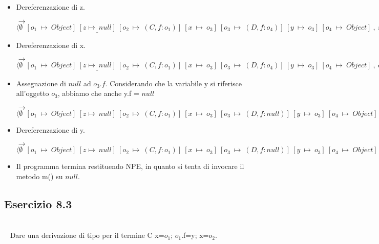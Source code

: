 \begin{itemize}
\vspace{0,5cm}
\item Dereferenzazione di z.

$\rightarrow$ $\langle\emptyset\:\:[o_1\:\mapsto\:Object]\:\underline{[z\mapsto\:null]}\:[o_2\:\mapsto\:(C,f:o_1)]\:[x\:\mapsto\:o_3]\:[o_3\:\mapsto\:(D,f:o_4)]\:[y\:\mapsto\:o_3]\:[o_4\:\mapsto\:Object]\:,\:x.f=null;.....\rangle$

\vspace{0,5cm}
\item Dereferenzazione di x.

$\rightarrow$ $\langle\emptyset\:\:[o_1\:\mapsto\:Object]\:\underline{[z\mapsto\:null]}\:[o_2\:\mapsto\:(C,f:o_1)]\:[x\:\mapsto\:o_3]\:[o_3\:\mapsto\:(D,f:o_4)]\:[y\:\mapsto\:o_3]\:[o_4\:\mapsto\:Object]\:,\:o_3.f=null;.....\rangle$

\vspace{0,5cm}
\item Assegnazione di $null$ ad $o_3.f$. Considerando che la variabile y si riferisce all'oggetto $o_3$, abbiamo che anche y.f = $null$

$\rightarrow$ $\langle\emptyset\:\:[o_1\:\mapsto\:Object]\:[z\mapsto\:null]\:[o_2\:\mapsto\:(C,f:o_1)]\:[x\:\mapsto\:o_3]\:[o_3\:\mapsto\:(D,f:null)]\:[y\:\mapsto\:o_3]\:[o_4\:\mapsto\:Object]\:,\:y.f.m();\rangle$

\vspace{0,5cm}
\item Dereferenzazione di y.

$\rightarrow$ $\langle\emptyset\:\:[o_1\:\mapsto\:Object]\:[z\mapsto\:null]\:[o_2\:\mapsto\:(C,f:o_1)]\:[x\:\mapsto\:o_3]\:[o_3\:\mapsto\:(D,f:null)]\:[y\:\mapsto\:o_3]\:[o_4\:\mapsto\:Object]\:,\:o_3.f.m();\rangle$

\vspace{0,5cm}
\item Il programma termina restituendo NPE, in quanto si tenta di invocare il metodo m() su $null$.

\end{itemize}


\vspace{1,5cm}
\subsection*{Esercizio 8.3}
\
\\
\
\vspace{0,6cm}
Dare una derivazione di tipo per il termine C x=$o_1$; $o_1$.f=y; x=$o_2$.
\vspace{0,6cm}

